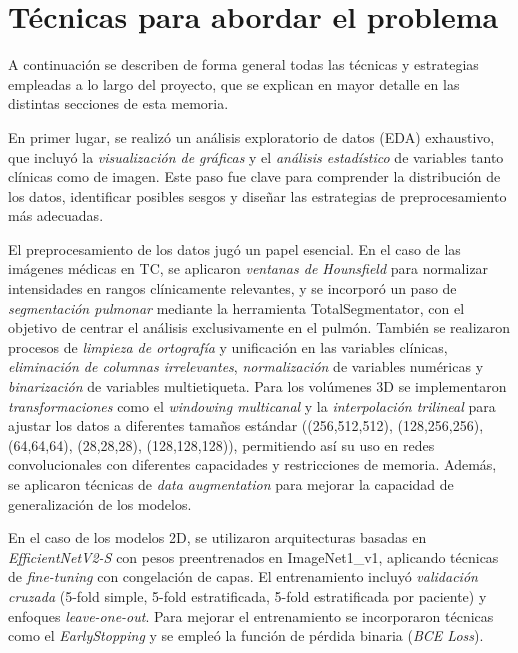 \section{Técnicas para abordar el problema}
A continuación se describen de forma general todas las técnicas y estrategias empleadas a lo largo del proyecto, que se explican en mayor detalle en las distintas secciones de esta memoria.

En primer lugar, se realizó un análisis exploratorio de datos (EDA) exhaustivo, que incluyó la \textit{visualización de gráficas} y el \textit{análisis estadístico} de variables tanto clínicas como de imagen. Este paso fue clave para comprender la distribución de los datos, identificar posibles sesgos y diseñar las estrategias de preprocesamiento más adecuadas.

El preprocesamiento de los datos jugó un papel esencial. En el caso de las imágenes médicas en TC, se aplicaron \textit{ventanas de Hounsfield} para normalizar intensidades en rangos clínicamente relevantes, y se incorporó un paso de \textit{segmentación pulmonar} mediante la herramienta TotalSegmentator, con el objetivo de centrar el análisis exclusivamente en el pulmón. También se realizaron procesos de \textit{limpieza de ortografía} y unificación en las variables clínicas, \textit{eliminación de columnas irrelevantes}, \textit{normalización} de variables numéricas y \textit{binarización} de variables multietiqueta. Para los volúmenes 3D se implementaron \textit{transformaciones} como el \textit{windowing multicanal} y la \textit{interpolación trilineal} para ajustar los datos a diferentes tamaños estándar ((256,512,512), (128,256,256), (64,64,64), (28,28,28), (128,128,128)), permitiendo así su uso en redes convolucionales con diferentes capacidades y restricciones de memoria. Además, se aplicaron técnicas de \textit{data augmentation} para mejorar la capacidad de generalización de los modelos.

En el caso de los modelos 2D, se utilizaron arquitecturas basadas en \textit{EfficientNetV2-S} con pesos preentrenados en ImageNet1\_v1, aplicando técnicas de \textit{fine-tuning} con congelación de capas. El entrenamiento incluyó \textit{validación cruzada} (5-fold simple, 5-fold estratificada, 5-fold estratificada por paciente) y enfoques \textit{leave-one-out}. Para mejorar el entrenamiento se incorporaron técnicas como el \textit{EarlyStopping} y se empleó la función de pérdida binaria (\textit{BCE Loss}).

